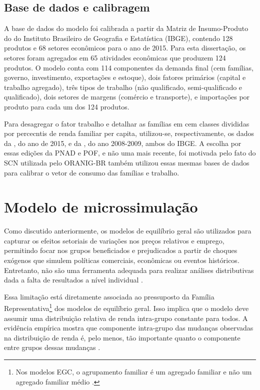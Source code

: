 \subsection{Base de dados e calibragem} \label{sec:dados_egc}

A base de dados do modelo foi calibrada a partir da Matriz de Insumo-Produto do  do Instituto Brasileiro de Geografia e Estatística (IBGE), contendo 128 produtos e 68 setores econômicos para o ano de 2015. Para esta dissertação, os setores foram agregados em 65 atividades econômicas que produzem 124 produtos. O modelo conta com 114 componentes da demanda final (cem famílias, governo, investimento, exportações e estoque), dois fatores primários (capital e trabalho agregado), três tipos de trabalho (não qualificado, semi-qualificado e qualificado), dois setores de margens (comércio e transporte), e importações por produto para cada um dos 124 produtos.

Para desagregar o fator trabalho e detalhar as famílias em cem classes divididas por percecntis de renda familiar per capita, utilizou-se, respectivamente, os dados da , do ano de 2015, e da , do ano 2008-2009, ambos do IBGE. A escolha por essas edições da PNAD e POF, e não uma mais recente, foi motivada pelo fato do SCN utilizada pelo ORANIG-BR também utilizou essas mesmas bases de dados para calibrar o vetor de consumo das famílias e trabalho.



\section{Modelo de microssimulação} \label{sec:microssimulacao}

Como discutido anteriormente, os modelos de equilíbrio geral são utilizados para capturar os efeitos setoriais de variações nos preços relativos e emprego, permitindo focar nos grupos beneficiados e prejudicados a partir de choques exógenos que simulem políticas comerciais, econômicas ou eventos históricos. Entretanto, não são uma ferramenta adequada para realizar análises distributivas dada a falta de resultados a nível individual \cite{tiberti17}.

Essa limitação está diretamente associada ao pressuposto da Família Representativa\footnote{Nos modelos EGC, o agrupamento familiar é um agregado familiar e não um agregado familiar médio \cite{tiberti17}.} dos modelos de equilíbrio geral. Isso implica que o modelo deve assumir uma distribuição relativa de renda intra-grupo constante para todos. A evidência empírica mostra que componente intra-grupo das mudanças observadas na distribuição de renda é, pelo menos, tão importante quanto o componente entre grupos dessas mudanças \cite{colombo08}.

